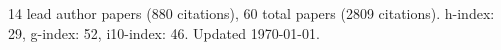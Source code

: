 14 lead author papers (880 citations),
60 total papers (2809 citations).\newline
h-index: 29, g-index: 52, i10-index: 46. Updated \today.